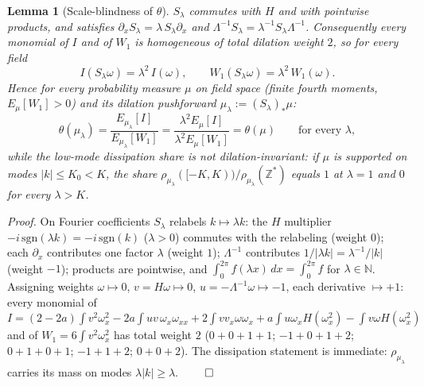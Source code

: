 \documentclass[11pt]{article}
\newtheorem{lemma}[theorem]{Lemma}
\theoremstyle{remark}
\theoremstyle{plain}
\newcommand{\eqdef}{:=}
\begin{document}
\begin{lemma}[Scale-blindness of $\theta$]\label{lem:scaleblind}
$S_\lambda$ commutes with $H$ and with pointwise products, and satisfies
$\partial_x S_\lambda = \lambda\, S_\lambda \partial_x$ and
$\Lambda^{-1} S_\lambda = \lambda^{-1} S_\lambda \Lambda^{-1}$. Consequently every monomial
of $I$ and of $W_1$ is homogeneous of total dilation weight $2$, so for every field
\begin{equation}
   I(S_\lambda\omega) = \lambda^2\, I(\omega), \qquad W_1(S_\lambda\omega) = \lambda^2\, W_1(\omega).
\end{equation}
Hence for every probability measure $\mu$ on field space (finite fourth moments,
$E_\mu[W_1]>0$) and its dilation pushforward $\mu_\lambda \eqdef (S_\lambda)_*\mu$:
\begin{equation}
   \theta(\mu_\lambda) = \frac{E_{\mu_\lambda}[I]}{E_{\mu_\lambda}[W_1]}
   = \frac{\lambda^2 E_\mu[I]}{\lambda^2 E_\mu[W_1]} = \theta(\mu) \qquad \text{for every } \lambda,
\end{equation}
while the low-mode dissipation share is \emph{not} dilation-invariant: if $\mu$ is
supported on modes $|k| \le K_0 < K$, the share
$\rho_{\mu_\lambda}([-K,K))/\rho_{\mu_\lambda}(\mathbb{Z}^*)$ equals $1$ at $\lambda = 1$
and $0$ for every $\lambda > K$.
\end{lemma}

\emph{Proof.} On Fourier coefficients $S_\lambda$ relabels $k \mapsto \lambda k$: the $H$
multiplier $-i\,\mathrm{sgn}(\lambda k) = -i\,\mathrm{sgn}(k)$ ($\lambda>0$) commutes with the
relabeling (weight $0$); each $\partial_x$ contributes one factor $\lambda$ (weight $1$);
$\Lambda^{-1}$ contributes $1/|\lambda k| = \lambda^{-1}/|k|$ (weight $-1$); products are
pointwise, and $\int_0^{2\pi} f(\lambda x)\,dx = \int_0^{2\pi} f$ for $\lambda\in\mathbb{N}$.
Assigning weights $\omega \mapsto 0$, $v = H\omega \mapsto 0$, $u = -\Lambda^{-1}\omega \mapsto -1$,
each derivative $\mapsto +1$: every monomial of
$I = (2-2a)\!\int\! v^2\omega_x^2 - 2a\!\int\! uv\,\omega_x\omega_{xx} + 2\!\int\! v v_x\omega\omega_x
+ a\!\int\! u\omega_x H(\omega_x^2) - \!\int\! v\omega H(\omega_x^2)$ and of
$W_1 = 6\int v^2\omega_x^2$ has total weight $2$ ($0{+}0{+}1{+}1$; $-1{+}0{+}1{+}2$;
$0{+}1{+}0{+}1$; $-1{+}1{+}2$; $0{+}0{+}2$). The dissipation statement is immediate:
$\rho_{\mu_\lambda}$ carries its mass on modes $\lambda|k| \ge \lambda$. $\qed$
\end{document}
